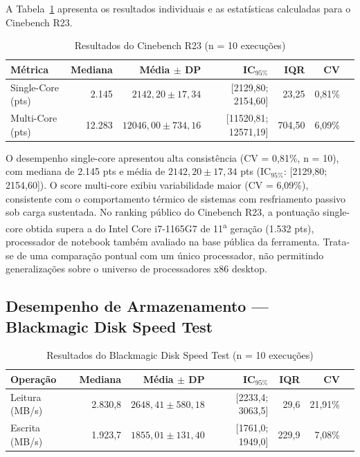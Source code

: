 \documentclass[12pt]{article}
\begin{document}
A Tabela~\ref{tab:cpu} apresenta os resultados individuais e as estat\'isticas
calculadas para o Cinebench R23.

\begin{table}[ht]
\centering
\caption{Resultados do Cinebench R23 (n = 10 execu\c{c}\~oes)}
\label{tab:cpu}
\begin{tabular}{lrrrrrr}
\toprule
\textbf{M\'etrica} & \textbf{Mediana} & \textbf{M\'edia $\pm$ DP} & \textbf{IC$_{95\%}$} & \textbf{IQR} & \textbf{CV} \\
\midrule
Single-Core (pts) & 2.145 & $2142{,}20 \pm 17{,}34$ & [2129,80; 2154,60] & 23,25 & 0,81\% \\
Multi-Core (pts)  & 12.283 & $12046{,}00 \pm 734{,}16$ & [11520,81; 12571,19] & 704,50 & 6,09\% \\
\bottomrule
\end{tabular}
\end{table}

O desempenho single-core apresentou alta consist\^encia (CV = 0,81\%, n = 10),
com mediana de 2.145 pts e m\'edia de $2142{,}20 \pm 17{,}34$ pts
(IC$_{95\%}$: [2129,80; 2154,60]). O score multi-core exibiu variabilidade
maior (CV = 6,09\%), consistente com o comportamento t\'ermico de sistemas
com resfriamento passivo sob carga sustentada. No ranking p\'ublico do
Cinebench R23, a pontua\c{c}\~ao single-core obtida supera a do Intel Core
i7-1165G7 de 11\textsuperscript{a} gera\c{c}\~ao (1.532 pts), processador
de notebook tamb\'em avaliado na base p\'ublica da ferramenta. Trata-se de
uma compara\c{c}\~ao pontual com um \'unico processador, n\~ao permitindo
generaliza\c{c}\~oes sobre o universo de processadores x86 desktop.

\subsection{Desempenho de Armazenamento --- Blackmagic Disk Speed Test}

\begin{table}[ht]
\centering
\caption{Resultados do Blackmagic Disk Speed Test (n = 10 execu\c{c}\~oes)}
\label{tab:storage}
\begin{tabular}{lrrrrrr}
\toprule
\textbf{Opera\c{c}\~ao} & \textbf{Mediana} & \textbf{M\'edia $\pm$ DP} & \textbf{IC$_{95\%}$} & \textbf{IQR} & \textbf{CV} \\
\midrule
Leitura (MB/s) & 2.830,8 & $2648{,}41 \pm 580{,}18$ & [2233,4; 3063,5] & 29,6 & 21,91\% \\
Escrita (MB/s) & 1.923,7 & $1855{,}01 \pm 131{,}40$ & [1761,0; 1949,0] & 229,9 & 7,08\% \\
\bottomrule
\end{tabular}
\end{table}
\end{document}
